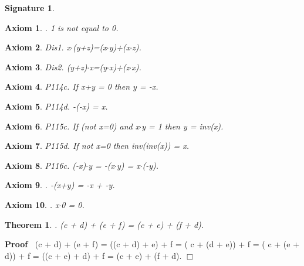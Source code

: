 \documentclass{article}
\newenvironment{forthel}{\begin{leftbar}}{\end{leftbar}}
\newenvironment{proof}{\noindent\textbf{Proof\ }}{\hspace*{\fill}$\Box$\medskip}
\newtheorem{axiom}{Axiom}
\newtheorem{theorem}{Theorem}
\newtheorem{signature}{Signature}
\begin{document}
\begin{forthel}
\begin{signature}
\end{signature}
\begin{axiom}. 1 is not equal to 0.

\end{axiom}

\begin{axiom} Dis1. x$\cdot$(y+z)=(x$\cdot$y)+(x$\cdot$z).

\end{axiom}
\begin{axiom} Dis2. (y+z)$\cdot$x=(y$\cdot$x)+(z$\cdot$x).

\end{axiom}


\begin{axiom} P114c. If x+y = 0 then y = -x.

\end{axiom}
\begin{axiom} P114d. -(-x) = x.

\end{axiom}
\begin{axiom} P115c. If (not x=0) and x$\cdot$y = 1 then y = inv(x).  

\end{axiom}
\begin{axiom} P115d. If not x=0 then inv(inv(x)) = x.

\end{axiom}
\begin{axiom} P116c. (-x)$\cdot$y = -(x$\cdot$y) = x$\cdot$(-y).

\end{axiom}

\begin{axiom}. -(x+y) = -x + -y. 

\end{axiom}
\begin{axiom}. x$\cdot$0 = 0. 

\end{axiom}

\begin{theorem}
. (c + d) + (e  + f) = (c + e) + (f   + d).
\end{theorem}\begin{proof}
 (c + d) + (e  + f)	= ((c +  d) +  e)  + f 
= ( c + (d  +  e)) + f 
= ( c + (e  +  d)) + f 
= ((c +  e) +  d)  + f 
=  (c +  e) + (f   + d).
\end{proof}



\end{forthel}
\end{document}
